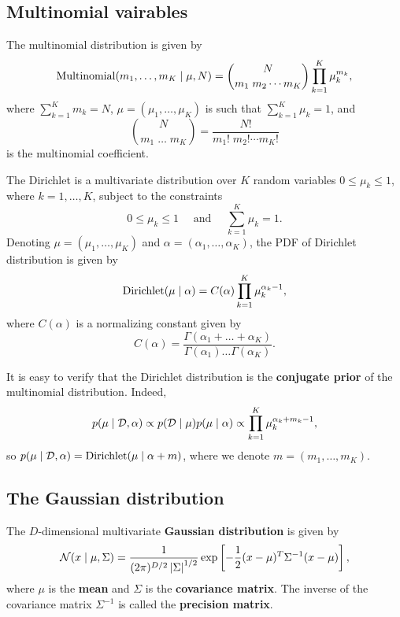 \documentclass[a4paper]{article}
\begin{document}
\subsection{Multinomial vairables}

\begin{defi}
The multinomial distribution is given by 
\[
\operatorname{Multinomial}(m_1, \dots, m_K \mid \mu, N)
= \binom{N}{m_1 \; m_2 \cdots m_K} \prod_{k=1}^K \mu_k^{m_k},
\]
where $\sum_{k=1}^K m_k = N$, 
$\mu = (\mu_1, \dots, \mu_K)$ is such that 
$\sum_{k=1}^K \mu_k = 1$, and 
\[
\binom{N}{m_1 \; \dots \; m_K}
= \frac{N!}{m_1! \; m_2! \cdots m_K!}
\]
is the multinomial coefficient.
\end{defi}

\begin{defi}
The Dirichlet is a multivariate distribution over $K$ 
random variables $0 \leq \mu_k \leq 1$,
where $k = 1, \dots, K$, subject to the constraints
\[
0 \leq \mu_k \leq 1 \quad 
\text{ and } \quad \sum_{k=1}^K \mu_k = 1.
\]
Denoting $\mu = (\mu_1, \dots, \mu_K)$ and 
$\alpha = (\alpha_1, \dots, \alpha_K)$,
the PDF of Dirichlet distribution is given by 
\[
\operatorname{Dirichlet}(\mu \mid \alpha)
= C(\alpha) \prod_{k=1}^K \mu_k^{\alpha_k - 1},
\]
where $C(\alpha)$ is a normalizing constant given by 
\[
C(\alpha) = \frac{\Gamma(\alpha_1 + \dots + \alpha_K)}
{\Gamma(\alpha_1) \dots \Gamma(\alpha_K)}.
\]
\end{defi}

It is easy to verify that the Dirichlet distribution
is the \textbf{conjugate prior} of the multinomial distribution. 
Indeed, 
\[
p(\mu \mid \mathcal{D}, \alpha)
\propto p(\mathcal{D} \mid \mu) p(\mu \mid \alpha) 
\propto \prod_{k=1}^K \mu_k^{\alpha_k + m_k - 1},
\]
so $p(\mu \mid \mathcal{D}, \alpha)
= \operatorname{Dirichlet}(\mu \mid \alpha + m)$, where we denote 
$m = (m_1, \dots, m_K)$.

\subsection{The Gaussian distribution}

\begin{defi}
The $D$-dimensional multivariate 
\textbf{Gaussian distribution} is given by 
\[
\mathcal{N} (x \mid \mu, \Sigma) 
= \frac{1}{(2\pi)^{D / 2} \left\lvert \Sigma\right\rvert^{1 / 2}}
\exp \left[ -\frac{1}{2} (x - \mu)^T \Sigma^{-1} (x - \mu) 
\right],
\]
where $\mu$ is the \textbf{mean} and $\Sigma$ is the 
\textbf{covariance matrix}.
The inverse of the covariance matrix $\Sigma^{-1}$ 
is called the \textbf{precision matrix}.
\end{defi}
\end{document}
